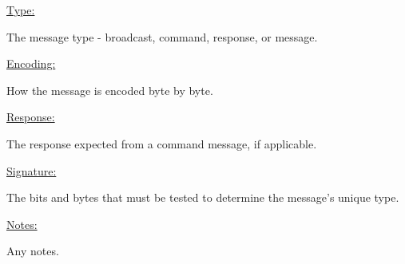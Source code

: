 \underline{Type:}

The message type - broadcast, command, response, or message.

\underline{Encoding:} 

How the message is encoded byte by byte.

\underline{Response:} 

The response expected from a command message, if applicable.

\underline{Signature:}

The bits and bytes that must be tested to determine the message's unique type.

\underline{Notes:} 

Any notes.





































































